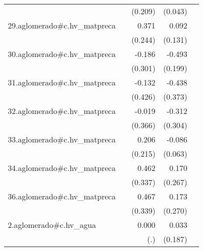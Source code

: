 {\begin{longtable}{l*{4}{D{.}{.}{-1}}}
            &                     &     (0.209)         &     (0.043)         &                     \\
\addlinespace
29.aglomerado#c.hv\_matpreca&                     &       0.371         &       0.092         &                     \\
            &                     &     (0.244)         &     (0.131)         &                     \\
\addlinespace
30.aglomerado#c.hv\_matpreca&                     &      -0.186         &      -0.493\sym{*}  &                     \\
            &                     &     (0.301)         &     (0.199)         &                     \\
\addlinespace
31.aglomerado#c.hv\_matpreca&                     &      -0.132         &      -0.438         &                     \\
            &                     &     (0.426)         &     (0.373)         &                     \\
\addlinespace
32.aglomerado#c.hv\_matpreca&                     &      -0.019         &      -0.312         &                     \\
            &                     &     (0.366)         &     (0.304)         &                     \\
\addlinespace
33.aglomerado#c.hv\_matpreca&                     &       0.206         &      -0.086         &                     \\
            &                     &     (0.215)         &     (0.063)         &                     \\
\addlinespace
34.aglomerado#c.hv\_matpreca&                     &       0.462         &       0.170         &                     \\
            &                     &     (0.337)         &     (0.267)         &                     \\
\addlinespace
36.aglomerado#c.hv\_matpreca&                     &       0.467         &       0.173         &                     \\
            &                     &     (0.339)         &     (0.270)         &                     \\
\addlinespace
2.aglomerado#c.hv\_agua&                     &       0.000         &       0.033         &                     \\
            &                     &         (.)         &     (0.187)         &                     \\

\end{longtable}}
